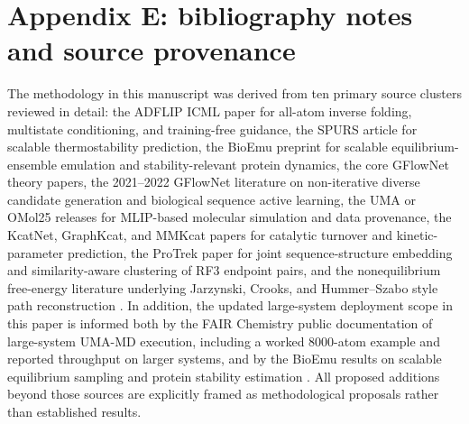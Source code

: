\documentclass[11pt]{article}
\begin{document}
	\section{Appendix E: bibliography notes and source provenance}
	
	The methodology in this manuscript was derived from ten primary source clusters reviewed in detail: the ADFLIP ICML paper for all-atom inverse folding, multistate conditioning, and training-free guidance, the SPURS article for scalable thermostability prediction, the BioEmu preprint for scalable equilibrium-ensemble emulation and stability-relevant protein dynamics, the core GFlowNet theory papers, the 2021--2022 GFlowNet literature on non-iterative diverse candidate generation and biological sequence active learning, the UMA or OMol25 releases for MLIP-based molecular simulation and data provenance, the KcatNet, GraphKcat, and MMKcat papers for catalytic turnover and kinetic-parameter prediction, the ProTrek paper for joint sequence-structure embedding and similarity-aware clustering of RF3 endpoint pairs, and the nonequilibrium free-energy literature underlying Jarzynski, Crooks, and Hummer--Szabo style path reconstruction \citep{yi2025adflip,li2026spurs,lewis2024bioemu,bengio2021noniter,bengio2023gflownet,malkin2022trajectory,madan2023subtb,jain2022bioseqgfn,wood2025uma,levine2025omol25,pan2026kcatnet,luo2025graphkcat,sun2025mmkcat,su2025trimodal,jarzynski1997nonequilibrium,crooks1999entropy,hummer2001free}. In addition, the updated large-system deployment scope in this paper is informed both by the FAIR Chemistry public documentation of large-system UMA-MD execution, including a worked $8000$-atom example and reported throughput on larger systems, and by the BioEmu results on scalable equilibrium sampling and protein stability estimation \citep{fairchem2025github,lewis2024bioemu}. All proposed additions beyond those sources are explicitly framed as methodological proposals rather than established results.
	
\end{document}

